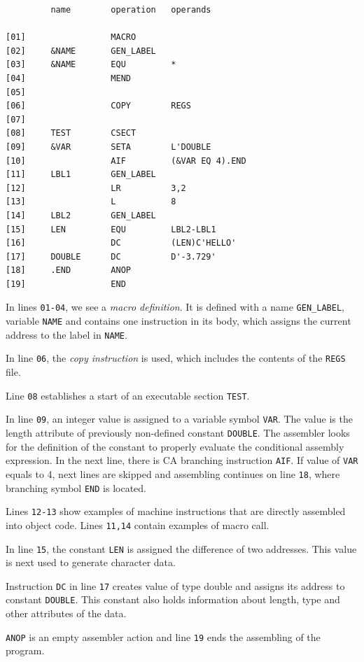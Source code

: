 \begin{verbatim}
         name        operation   operands
         
[01]                 MACRO                   
[02]     &NAME       GEN_LABEL
[03]     &NAME       EQU         *
[04]                 MEND
[05]             
[06]                 COPY        REGS
[07]             
[08]     TEST        CSECT
[09]     &VAR        SETA        L'DOUBLE
[10]                 AIF         (&VAR EQ 4).END
[11]     LBL1        GEN_LABEL
[12]                 LR          3,2
[13]                 L           8
[14]     LBL2        GEN_LABEL
[15]     LEN         EQU         LBL2-LBL1
[16]                 DC          (LEN)C'HELLO'
[17]     DOUBLE      DC          D'-3.729'
[18]     .END        ANOP
[19]                 END
\end{verbatim} 

In lines \verb|01-04|, we see a \emph{macro definition}. It is defined with a name \verb|GEN_LABEL|, variable \verb|NAME| and contains one instruction in its body, which assigns the current address to the label in \verb|NAME|.

In line \verb|06|, the \emph{copy instruction} is used, which includes the contents of the \verb|REGS| file.

Line \verb|08| establishes a start of an executable section \verb|TEST|. 

In line \verb|09|, an integer value is assigned to a variable symbol \verb|VAR|. The value is the length attribute of previously non-defined constant \verb|DOUBLE|. The assembler looks for the definition of the constant to properly evaluate the conditional assembly expression. In the next line, there is CA branching instruction \verb|AIF|. If value of \verb|VAR| equals to 4, next lines are skipped and assembling continues on line \verb|18|, where branching symbol \verb|END| is located.  

Lines \verb|12-13| show examples of machine instructions that are directly assembled into object code. Lines \verb|11,14| contain examples of macro call.

In line \verb|15|, the constant \verb|LEN| is assigned the difference of two addresses. This value is next used to generate character data.

Instruction \verb|DC| in line \verb|17| creates value of type double and assigns its address to constant \verb|DOUBLE|. This constant also holds information about length, type and other attributes of the data.  

\verb|ANOP| is an empty assembler action and line \verb|19| ends the assembling of the program. 

\vspace{5mm}